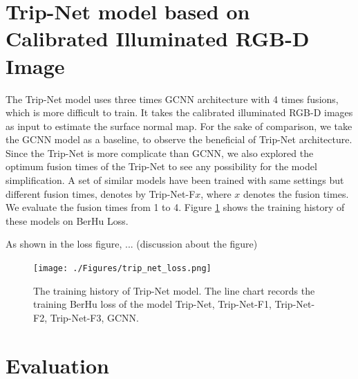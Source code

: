 \documentclass[border=15pt, multi, tikz]{article}
\begin{document}
\section{Trip-Net model based on Calibrated Illuminated RGB-D Image}
The Trip-Net model uses three times GCNN architecture with 4 times fusions, which is more difficult to train. It takes the calibrated illuminated RGB-D images as input to estimate the surface normal map. For the sake of comparison, we take the GCNN model as a baseline, to observe the beneficial of Trip-Net architecture. Since the Trip-Net is more complicate than GCNN, we also explored the optimum fusion times of the Trip-Net to see any possibility for the model simplification. A set of similar models have been trained with same settings but different fusion times, denotes by Trip-Net-F$ x $, where $ x $ denotes the fusion times. We evaluate the fusion times from 1 to 4. Figure \ref{fig:trip-net-training-history} shows the training history of these models on BerHu Loss. 

As shown in the loss figure, ... (discussion about the figure)

\begin{figure}[th]
	\centering
	\texttt{[image: ./Figures/trip\_net\_loss.png]}
	\caption{The training history of Trip-Net model. The line chart records the training BerHu loss of the model Trip-Net, Trip-Net-F1, Trip-Net-F2, Trip-Net-F3, GCNN.}
	\label{fig:trip-net-training-history}
\end{figure}


\section{Evaluation}
\end{document}
